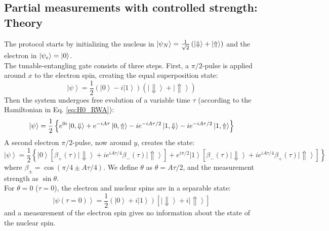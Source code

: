 \subsection{Partial measurements with controlled strength: Theory}
\label{sec:theory}
The protocol starts by initializing the nucleus in $\left|\psi_N\right> = \frac{1}{\sqrt{2}} \left( \left|\Downarrow\right>+\left|\Uparrow\right> \right)$ and the electron in $\left|\psi_e\right> = \left|0\right>$.\\
The tunable-entangling gate consists of three steps. First, a $\pi/2$-pulse is applied around $x$ to the electron spin, creating the equal superposition state:
\begin{equation}
\left| \psi \right \rangle = \frac{1}{2} \left( \left| 0 \right \rangle - i \left| 1 \right \rangle \right) \left( \left| \Downarrow \right \rangle +\left| \Uparrow \right \rangle\right)
\end{equation}
Then the system undergoes free evolution of a variable time $\tau$ (according to the Hamiltonian in Eq. \ref{eq:H0_RWA}):
\begin{equation}
\left| \psi\right> = \frac{1}{2} \left \lbrace e^{0i} \left| 0, \Downarrow \right> + e^{-i A \tau} \left| 0, \Uparrow \right> - i  e^{-i A \tau/2} \left| 1, \Downarrow \right> - i  e^{-i A \tau/2} \left| 1, \Uparrow\right> \right \rbrace
\end{equation}
A second electron $\pi/2$-pulse, now around $y$, creates the state:
\begin{equation}
\left| \psi \right \rangle = \frac{1}{2} \left\lbrace \left| 0 \right \rangle \left[ \beta_+ (\tau) \left| \Downarrow \right \rangle + i e^{i A\tau/4} \beta_-(\tau) \left| \Uparrow \right \rangle \right] + e^{i\pi /2} \left| 1 \right \rangle \left[ \beta_-(\tau) \left| \Downarrow \right \rangle + i e^{i A\tau/4} \beta_+(\tau) \left| \Uparrow \right \rangle \right] \right\rbrace
\label{eq:state}
\end{equation}
where $\beta_{\pm} = \cos(\pi/4 \pm  A \tau/4)$. We define $\theta$ as $\theta= A \tau/2$, and the measurement strength as $\sin\theta$.\\
For $\theta=0$ ($\tau = 0$), the electron and nuclear spins are in a separable state:
\begin{equation}
\left| \psi (\tau=0) \right \rangle = \frac{1}{2} \left( \left| 0 \right \rangle +i \left| 1 \right \rangle \right) \left[ \left| \Downarrow \right \rangle +  i \left| \Uparrow \right \rangle \right]
\end{equation}
and a measurement of the electron spin gives no information about the state of the nuclear spin.
